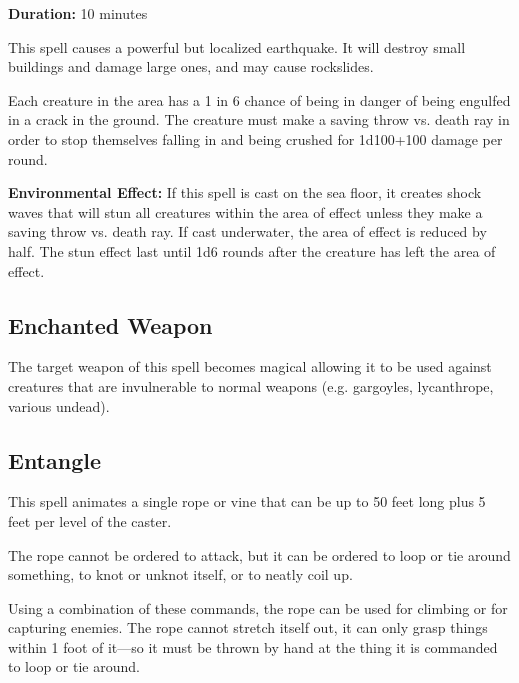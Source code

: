 \begin{multicols*}{2}
{\textbf{Duration:} 10 minutes}

This spell causes a powerful but localized earthquake. It will destroy small buildings and damage large ones, and may cause rockslides.

Each creature in the area has a 1 in 6 chance of being in danger of being engulfed in a crack in the ground. The creature must make a saving throw vs. death ray in order to stop themselves falling in and being crushed for 1d100+100 damage per round.

\textbf{Environmental Effect:} If this spell is cast on the sea floor, it creates shock waves that will stun all creatures within the area of effect unless they make a saving throw vs. death ray. If cast underwater, the area of effect is reduced by half. The stun effect last until 1d6 rounds after the creature has left the area of effect.

\subsection{Enchanted Weapon}\label{spell:Enchanted Weapon}

The target weapon of this spell becomes magical allowing it to be used against creatures that are invulnerable to normal weapons (e.g. gargoyles, lycanthrope, various undead).

\subsection{Entangle}\label{spell:Entangle}

This spell animates a single rope or vine that can be up to 50 feet long plus 5 feet per level of the caster.

The rope cannot be ordered to attack, but it can be ordered to loop or tie around something, to knot or unknot itself, or to neatly coil up.

Using a combination of these commands, the rope can be used for climbing or for capturing enemies. The rope cannot stretch itself out, it can only grasp things within 1 foot of it—so it must be thrown by hand at the thing it is commanded to loop or tie around.


\end{multicols*}
